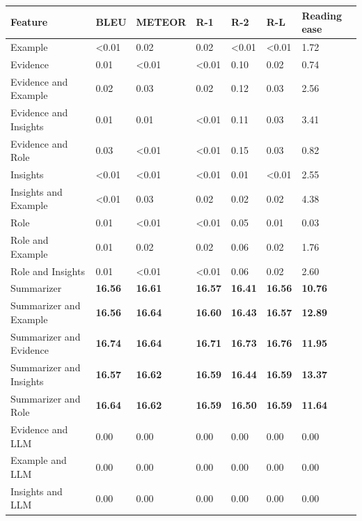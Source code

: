 \begin{tabular}{|l|l|l|l|l|l|l|}
\hline
\textbf{Feature} & BLEU & METEOR & R-1 & R-2 & R-L & Reading ease \\
 \hline
 Example & \textless{}0.01 & 0.02 & 0.02 & \textless{}0.01 & \textless{}0.01 & 1.72 \\
 \hline
 Evidence & 0.01 & \textless{}0.01 & \textless{}0.01 & 0.10 & 0.02 & 0.74 \\
 \hline
 Evidence and Example & 0.02 & 0.03 & 0.02 & 0.12 & 0.03 & 2.56 \\
 \hline
 Evidence and Insights & 0.01 & 0.01 & \textless{}0.01 & 0.11 & 0.03 & 3.41 \\
 \hline
 Evidence and Role & 0.03 & \textless{}0.01 & \textless{}0.01 & 0.15 & 0.03 & 0.82 \\
 \hline
 Insights & \textless{}0.01 & \textless{}0.01 & \textless{}0.01 & 0.01 & \textless{}0.01 & 2.55 \\
 \hline
 Insights and Example & \textless{}0.01 & 0.03 & 0.02 & 0.02 & 0.02 & 4.38 \\
 \hline
 Role & 0.01 & \textless{}0.01 & \textless{}0.01 & 0.05 & 0.01 & 0.03 \\
 \hline
 Role and Example & 0.01 & 0.02 & 0.02 & 0.06 & 0.02 & 1.76 \\
 \hline
 Role and Insights & 0.01 & \textless{}0.01 & \textless{}0.01 & 0.06 & 0.02 & 2.60 \\
 \hline
 Summarizer & \textbf{16.56} & \textbf{16.61} & \textbf{16.57} & \textbf{16.41} & \textbf{16.56} & \textbf{10.76} \\
 \hline
 Summarizer and Example & \textbf{16.56} & \textbf{16.64} & \textbf{16.60} & \textbf{16.43} & \textbf{16.57} & \textbf{12.89} \\
 \hline
 Summarizer and Evidence & \textbf{16.74} & \textbf{16.64} & \textbf{16.71} & \textbf{16.73} & \textbf{16.76} & \textbf{11.95} \\
 \hline
 Summarizer and Insights & \textbf{16.57} & \textbf{16.62} & \textbf{16.59} & \textbf{16.44} & \textbf{16.59} & \textbf{13.37} \\
 \hline
 Summarizer and Role & \textbf{16.64} & \textbf{16.62} & \textbf{16.59} & \textbf{16.50} & \textbf{16.59} & \textbf{11.64} \\
 \hline
 Evidence and LLM & 0.00 & 0.00 & 0.00 & 0.00 & 0.00 & 0.00 \\
 \hline
 Example and LLM & 0.00 & 0.00 & 0.00 & 0.00 & 0.00 & 0.00 \\
 \hline
 Insights and LLM & 0.00 & 0.00 & 0.00 & 0.00 & 0.00 & 0.00 \\

\end{tabular}
